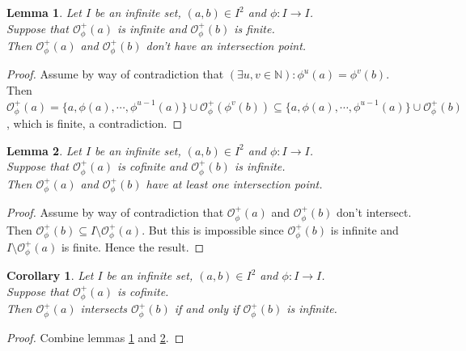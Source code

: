 \documentclass[a4paper,11pt]{article}
\theoremstyle{plain}
\newtheorem{corollary}{Corollary}[section]
\newtheorem{lemma}{Lemma}[section]
\theoremstyle{definition}
\theoremstyle{remark}
\begin{document}
\begin{lemma}
\label{lemmaTwoOrbInfAndFinDon'tIntersect}
Let $I$ be an infinite set, $(a,b) \in I^2$ and $\phi : I \to I$. \\
Suppose that $\mathcal{O}^{+}_\phi(a)$ is infinite and $\mathcal{O}^{+}_\phi(b)$ is finite. \\
Then $\mathcal{O}^{+}_\phi(a)$ and $\mathcal{O}^{+}_\phi(b)$ don't have an intersection point.
\end{lemma}

\begin{proof}
Assume by way of contradiction that $(\exists u,v \in \mathbb{N}) : \phi^u(a) = \phi^v(b)$. Then $\mathcal{O}^{+}_\phi(a) = \{a,\phi(a),\cdots,\phi^{u-1}(a)\} \cup \mathcal{O}^{+}_\phi(\phi^v(b)) \subseteq  \{a,\phi(a),\cdots,\phi^{u-1}(a)\} \cup \mathcal{O}^{+}_\phi(b)$, which is finite, a contradiction.
\end{proof}


\begin{lemma}
\label{lemmaTwoOrbInfAndCofIntersectCofinitely}
Let $I$ be an infinite set, $(a,b) \in I^2$ and $\phi : I \to I$. \\
Suppose that $\mathcal{O}^{+}_\phi(a)$ is cofinite and $\mathcal{O}^{+}_\phi(b)$ is infinite. \\
Then $\mathcal{O}^{+}_\phi(a)$ and $\mathcal{O}^{+}_\phi(b)$ have at least one intersection point.
\end{lemma}

\begin{proof}
Assume by way of contradiction that $\mathcal{O}^{+}_\phi(a)$ and $\mathcal{O}^{+}_\phi(b)$ don't intersect. Then $\mathcal{O}^{+}_\phi(b) \subseteq I \setminus \mathcal{O}^{+}_\phi(a)$. But this is impossible since $\mathcal{O}^{+}_\phi(b)$ is infinite and $I \setminus \mathcal{O}^{+}_\phi(a)$ is finite. Hence the result.
\end{proof}

\begin{corollary}
\label{corollaryACofOrbIntersectsAnOrbitWhenThisOrbitIsInfinite}
Let $I$ be an infinite set, $(a,b) \in I^2$ and $\phi : I \to I$. \\
Suppose that $\mathcal{O}^{+}_\phi(a)$ is cofinite. \\
Then $\mathcal{O}^{+}_\phi(a)$ intersects $\mathcal{O}^{+}_\phi(b)$ if and only if $\mathcal{O}^{+}_\phi(b)$ is infinite.
\end{corollary}

\begin{proof}
Combine lemmas \ref{lemmaTwoOrbInfAndFinDon'tIntersect} and \ref{lemmaTwoOrbInfAndCofIntersectCofinitely}.
\end{proof}
\end{document}
